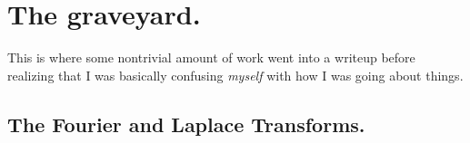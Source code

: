 \documentclass[letterpaper,12pt]{report}
\begin{document}









\chapter{The graveyard.}

This is where some nontrivial amount of work
went into a writeup before realizing that I was
basically confusing \emph{myself} with how I was going
about things.


\section{The Fourier and Laplace Transforms.}



\end{document}

